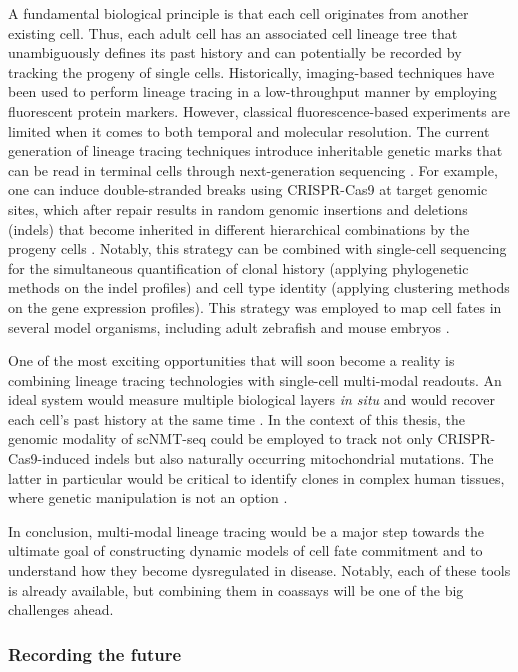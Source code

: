 A fundamental biological principle is that each cell originates from another existing cell. Thus, each adult cell has an associated cell lineage tree that unambiguously defines its past history and can potentially be recorded by tracking the progeny of single cells. Historically, imaging-based techniques have been used to perform lineage tracing in a low-throughput manner by employing fluorescent protein markers. However, classical fluorescence-based experiments are limited when it comes to both temporal and molecular resolution. The current generation of lineage tracing techniques introduce inheritable genetic marks that can be read in terminal cells through next-generation sequencing \cite{Baron2019,Kester2018,McKenna2019}. For example, one can induce double-stranded breaks using CRISPR-Cas9 at target genomic sites, which after repair results in random genomic insertions and deletions (indels) that become inherited in different hierarchical combinations by the progeny cells \cite{Baron2019,Kester2018,McKenna2019}. Notably, this strategy can be combined with single-cell sequencing for the simultaneous quantification of clonal history (applying phylogenetic methods on the indel profiles) and cell type identity (applying clustering methods on the gene expression profiles). This strategy was employed to map cell fates in several model organisms, including adult zebrafish \cite{Alemany2018} and mouse embryos \cite{Chan2019}. 

One of the most exciting opportunities that will soon become a reality is combining lineage tracing technologies with single-cell multi-modal readouts. An ideal system would measure multiple biological layers \textit{in situ} and would recover each cell's past history at the same time \cite{McKenna2019}. In the context of this thesis, the genomic modality of scNMT-seq could be employed to track not only CRISPR-Cas9-induced indels but also naturally occurring mitochondrial mutations. The latter in particular would be critical to identify clones in complex human tissues, where genetic manipulation is not an option \cite{Ludwig2019}. 

In conclusion, multi-modal lineage tracing would be a major step towards the ultimate goal of constructing dynamic models of cell fate commitment and to understand how they become dysregulated in disease. Notably, each of these tools is already available, but combining them in coassays will be one of the big challenges ahead.

\subsubsection{Recording the future} 

